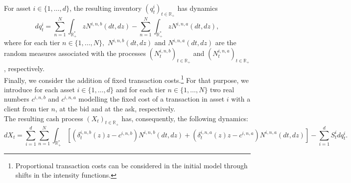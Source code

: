 \documentclass[preprint, 3p]{elsarticle}
\newcommand{\1}{{\chi}}
\begin{document}
For asset $i \in \{1,\ldots , d\}$, the resulting inventory $(q^i_t)_{t \in \mathbb R_+}$ has dynamics $$dq^i_t = \sum_{n=1}^N \int_{\mathbb R_+^*} z N^{i,n,b}(dt,dz) - \sum_{n=1}^N \int_{\mathbb R_+^*} z N^{i,n,a}(dt,dz),$$ where for each tier $n \in \{1,\ldots, N\}  ,$ $N^{i,n,b}(dt,dz)$ and $N^{i,n,a}(dt,dz)$ are the random measures associated with the processes $(N^{i,n,b}_t)_{t \in \mathbb R_+}$ and $(N^{i,n,a}_t)_{t \in \mathbb R_+}$, respectively.\\

Finally, we consider the addition of fixed transaction costs.\footnote{Proportional transaction costs can be considered in the initial model through shifts in the intensity functions.} For that purpose, we introduce for each asset $i \in \{1,\ldots, d\}$ and for each  tier $n \in \{1,\ldots,N\}$ two real numbers $c^{i,n,b}$ and $c^{i,n,a}$ modelling the fixed cost of a transaction in asset $i$ with a client from tier $n$, at the bid and at the ask, respectively.\\

The resulting cash process $(X_t)_{t \in \mathbb R_+}$ has, consequently, the following dynamics:
$$dX_t = \sum_{i=1}^d \sum_{n=1}^N \int_{\mathbb{R}_+^*} \left[ \left( \delta^{i,n,b}_t(z)z - c^{i,n,b} \right) N^{i,n,b}(dt,dz) +   \left( \delta^{i,n,a}_t(z)z - c^{i,n,a} \right) N^{i,n,a}(dt,dz) \right] -  \sum_{i=1}^d  S^{i}_t dq^i_t.$$
\end{document}
